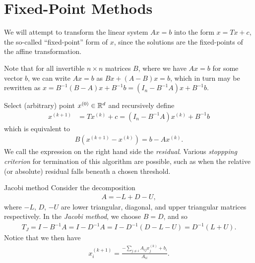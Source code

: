 \section{Fixed-Point Methods}

We will attempt to transform the linear system $Ax = b$ into the form $x = Tx + c$, the so-called ``fixed-point'' form of $x$, since the solutions are the fixed-points of the affine transformation.

Note that for all invertible $n \times n$ matrices $B$, where we have $Ax = b$ for some vector $b$, we can write $Ax = b$ as $Bx + (A - B)x = b$, which in turn may be rewritten as $x = B^{-1}(B-A)x + B^{-1}b = (I_n - B^{-1}A)x + B^{-1}b$.

\begin{defn}
    Select (arbitrary) point $x^{(0)} \in \mathbb{R}^{d}$ and recursively define
    \begin{align*}
        x^{(k+1)} &= Tx^{(k)} + c = \left(I_n - B^{-1}A\right)x^{(k)} + B^{-1}b
    \end{align*}
    which is equivalent to
    \begin{align*}
        B\left(x^{(k+1)} - x^{(k)}\right) = b - Ax^{(k)}.
    \end{align*}
    We call the expression on the right hand side the \emph{residual}. Various \emph{stoppping criterion} for termination of this algorithm are possible, such as when the relative (or absolute) residual falls beneath a chosen threshold.
\end{defn}

\begin{defn}{Jacobi method}\proofbreak
    Consider the decomposition
    \begin{align*}
        A = -L + D - U,
    \end{align*}
    where $-L$, $D$, $-U$ are lower triangular, diagonal, and upper triangular matrices respectively. In the \emph{Jacobi method}, we choose $B = D$, and so
    \begin{align*}
        T_{J} = I - B^{-1}A = I - D^{-1}A = I-D^{-1}(D - L - U) = D^{-1}(L + U).
    \end{align*}
    Notice that we then have
    \begin{align*}
        x^{(k + 1)}_{i} = \frac{-\sum_{j\neq i}A_{ij}x^{(k)}_j + b_i}{A_{ii}}.
    \end{align*}
\end{defn}

